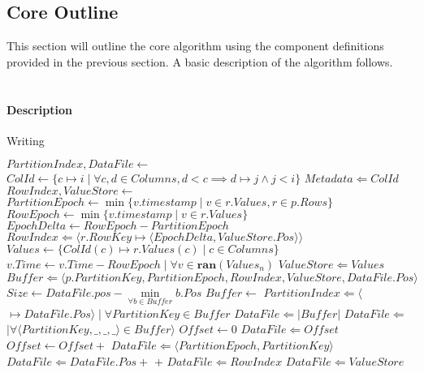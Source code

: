 \documentclass[fleqn]{article}
\begin{document}
\subsection{Core Outline}
\small
This section will outline the core algorithm using the component definitions provided in the previous
section. A basic description of the algorithm follows.
\\\\
\paragraph{Description}

\begin{algorithm}
\scriptsize
\caption{Writing}
\begin{algorithmic}[1]
\State $PartitionIndex, DataFile \gets $ 
\State $ColId \gets \{c \mapsto i \mid \forall c, d \in Columns, d < c \implies d \mapsto j \wedge j < i \}$
\State $Metadata \Leftarrow ColId$
\Statex
{} 
 \State $RowIndex, ValueStore \gets $ 
 \State $PartitionEpoch \gets \min \{v.timestamp \mid v \in r.Values, r \in p.Rows\}$
 \Statex
   \State $RowEpoch \gets \min \{v.timestamp \mid v \in r.Values\}$
   \State $EpochDelta \gets RowEpoch - PartitionEpoch$
   \State $RowIndex \Leftarrow \langle r.RowKey \mapsto \langle EpochDelta, ValueStore.Pos \rangle \rangle $ 
   \State $Values \gets \{ ColId(c) \mapsto r.Values(c) \mid c \in Columns \}$
   \State $v.Time \gets v.Time - RowEpoch \mid \forall v \in \mathbf{ran}(Values_{n})$
   \State $ ValueStore \Leftarrow Values $
 \EndFor
\Statex
 \State $Buffer \Leftarrow \langle p.PartitionKey, PartitionEpoch, RowIndex, ValueStore, DataFile.Pos \rangle$
 \State $Size \gets DataFile.pos - \min\limits_{\forall b \in Buffer} b.Pos $
   \State {}
   \State $Buffer \gets $ 
 \EndIf
\EndFor
\State {}
\EndProcedure
\Statex
{}
   \State $PartitionIndex \Leftarrow \langle $$ \mapsto DataFile.Pos \rangle \mid \forall PartitionKey \in Buffer$
   \State $DataFile \Leftarrow \lvert Buffer \rvert$
   \State $DataFile \Leftarrow $  $ \mid \forall \langle PartitionKey, \_,\_,\_\rangle \in Buffer \rangle$
   \State $Offset \gets 0$
     \State $DataFile \Leftarrow Offset$
     \State $Offset \gets Offset + $ 
   \EndFor
    \State $DataFile \Leftarrow \langle PartitionEpoch, PartitionKey \rangle$
    \State $DataFile \Leftarrow DataFile.Pos + $  $ + $ 
    \State $DataFile \Leftarrow RowIndex$
    \State $DataFile \Leftarrow ValueStore$
   \EndFor
\EndProcedure
\end{algorithmic}
\end{algorithm}
\end{document}
